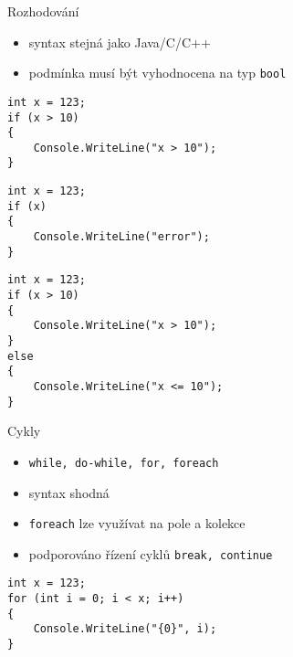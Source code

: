 


\begin{frame}[fragile]
\begin{block}{Rozhodování}
\begin{itemize}
\item syntax stejná jako Java/C/C++
\item podmínka musí být vyhodnocena na typ \lstinline|bool|
\end{itemize}
\end{block}
\begin{yesblock}
\begin{lstlisting}
int x = 123;
if (x > 10)
{
    Console.WriteLine("x > 10");
}
\end{lstlisting}
\end{yesblock}

\begin{noblock}
\begin{lstlisting}
int x = 123;
if (x)
{
    Console.WriteLine("error");
}
\end{lstlisting}
\end{noblock}
\end{frame}

\begin{frame}[fragile]
\begin{yesblock}
\begin{lstlisting}
int x = 123;
if (x > 10)
{
    Console.WriteLine("x > 10");
}
else
{
    Console.WriteLine("x <= 10");
}
\end{lstlisting}
\end{yesblock}
\end{frame}





\begin{frame}[fragile]
\begin{block}{Cykly}
\begin{itemize}
\item \lstinline|while, do-while, for, foreach|
\item syntax shodná
\item \lstinline|foreach| lze využívat na pole a kolekce
\item podporováno řízení cyklů \lstinline|break, continue|
\end{itemize}
\end{block}
\begin{yesblock}
\begin{lstlisting}
int x = 123;
for (int i = 0; i < x; i++) 
{
    Console.WriteLine("{0}", i);
}
\end{lstlisting}
\end{yesblock}
\end{frame}



